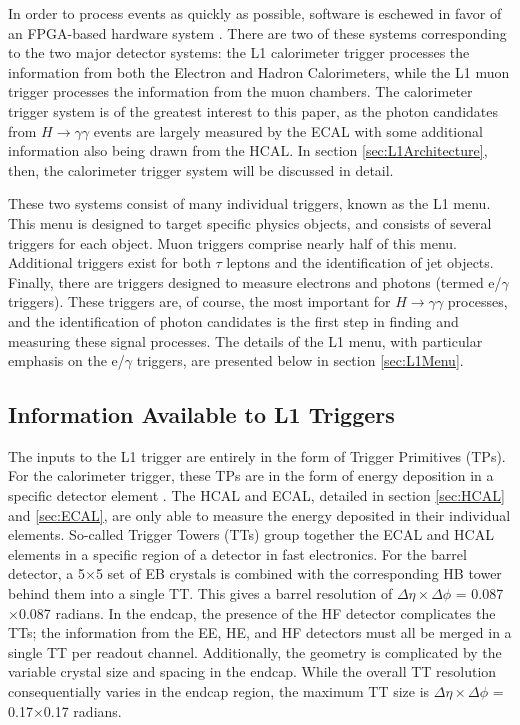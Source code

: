 \documentclass[12pt]{ucsddissertation}
\begin{document}
In order to process events as quickly as possible, software is eschewed in favor of an FPGA-based hardware system \cite{CMSTrigger2017}. There are two of these systems corresponding to the two major detector systems: the L1 calorimeter trigger processes the information from both the Electron and Hadron Calorimeters, while the L1 muon trigger processes the information from the muon chambers. The calorimeter trigger system is of the greatest interest to this paper, as the photon candidates from $H \rightarrow \gamma \gamma$ events are largely measured by the ECAL with some additional information also being drawn from the HCAL. In section \ref{sec:L1Architecture}, then, the calorimeter trigger system will be discussed in detail.

These two systems consist of many individual triggers, known as the L1 menu. This menu is designed to target specific physics objects, and consists of several triggers for each object. Muon triggers comprise nearly half of this menu. Additional triggers exist for both $\tau$ leptons and the identification of jet objects. Finally, there are triggers designed to measure electrons and photons (termed e/$\gamma$ triggers). These triggers are, of course, the most important for $H \rightarrow \gamma \gamma$ processes, and the identification of photon candidates is the first step in finding and measuring these signal processes. The details of the L1 menu, with particular emphasis on the e/$\gamma$ triggers, are presented below in section \ref{sec:L1Menu}.
\subsection{Information Available to L1 Triggers} \label{sec:L1Info}
The inputs to the L1 trigger are entirely in the form of Trigger Primitives (TPs). For the calorimeter trigger, these TPs are in the form of energy deposition in a specific detector element \cite{L12020}. The HCAL and ECAL, detailed in section \ref{sec:HCAL} and \ref{sec:ECAL}, are only able to measure the energy deposited in their individual elements. So-called Trigger Towers (TTs) group together the ECAL and HCAL elements in a specific region of a detector in fast electronics. For the barrel detector, a 5$\times$5 set of EB crystals is combined with the corresponding HB tower behind them into a single TT. This gives a barrel resolution of $\Delta \eta \times \Delta \phi$ = 0.087$\times$0.087 radians. In the endcap, the presence of the HF detector complicates the TTs; the information from the EE, HE, and HF detectors must all be merged in a single TT per readout channel. Additionally, the geometry is complicated by the variable crystal size and spacing in the endcap. While the overall TT resolution consequentially varies in the endcap region, the maximum TT size is  $\Delta \eta \times \Delta \phi$ = 0.17$\times$0.17 radians. 
\end{document}
